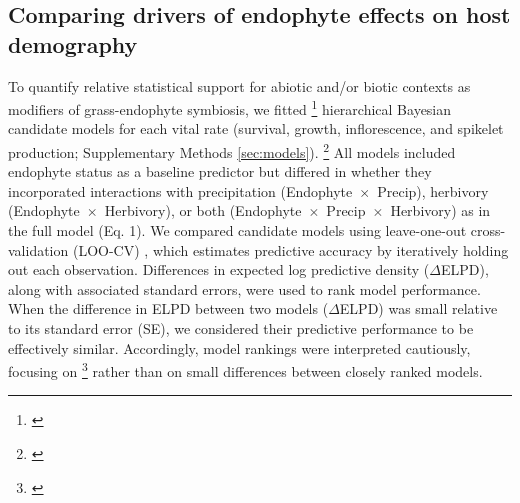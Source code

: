 \documentclass[12pt]{article}\usepackage[]{graphicx}\usepackage[dvipsnames]{xcolor}
\newcommand{\tom}[2]{{\color{red}{#1}}\footnote{\textit{\color{red}{#2}}}}
\newcommand{\jacob}[2]{{\color{blue}{#1}}\footnote{\textit{\color{blue}{#2}}}}
\begin{document}
\subsection*{Comparing drivers of endophyte effects on host demography}
To quantify relative statistical support for abiotic and/or biotic contexts as modifiers of grass-endophyte symbiosis, we fitted \jacob{three}{My instinct is to leave "the main effect " out because a standalone endophyte main effect model represents the null hypothesis (endophyte effect is constant regardless of context), and our framing is explicitly about context-dependency. Including it could actually weaken the narrative by making the comparison feel more exploratory than hypothesis-driven. That said, if you think reviewers might push back on its absence, we could include it as a null baseline and explicitly frame it that way. What do you think?} hierarchical Bayesian candidate models for each vital rate (survival, growth, inflorescence, and spikelet production; Supplementary Methods \ref{sec:models}).
\tom{}{My instinct is to include the ``main effect'' model (symbiont only) because it cleanly maps to the null hypothesis of context-INdependent mutualism, which seems relevant to assess alongside the modifiers. I would also include models with symbiont:climate + symbiont:herbivory but no 3-way interaction.}
All models included endophyte status as a baseline predictor but differed in whether they incorporated interactions with precipitation (Endophyte~$\times$~Precip), herbivory (Endophyte~$\times$~Herbivory), or both (Endophyte~$\times$~Precip~$\times$~Herbivory) as in the full model (Eq. 1).
We compared candidate models using leave-one-out cross-validation (LOO-CV) \citep{vehtari2017practical}, which estimates predictive accuracy by iteratively holding out each observation. 
Differences in expected log predictive density ($\Delta$ELPD), along with associated standard errors, were used to rank model performance.
When the difference in ELPD between two models ($\Delta$ELPD) was small relative to its standard error (SE), we considered their predictive performance to be effectively similar. 
Accordingly, model rankings were interpreted cautiously, focusing on \tom{consistent trends across vital rates}{This is a little confusing because you do not show model selection results for each vital rate. If the intention is that by fitting everything together you are testing biotic and abiotic factors aggregated over vital rates I would make that clearer here.} rather than on small differences between closely ranked models.
\end{document}
